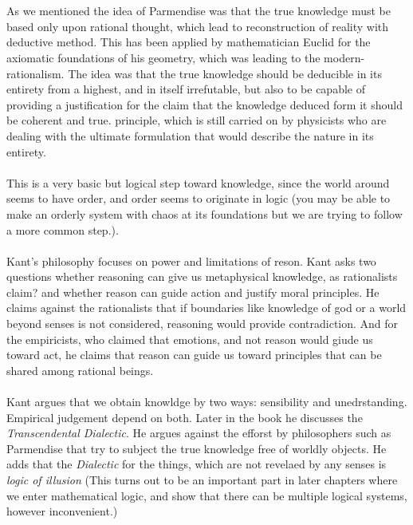 \documentclass[9pt,a4paper,twocolumn]{article}
\begin{document}
                \\
                \\
                As we mentioned the idea of Parmendise was that the true knowledge must be based only upon rational thought, which lead to reconstruction of reality with deductive method. This has been applied by mathematician Euclid for the axiomatic foundations of his geometry, which was leading to the modern-rationalism. The idea was that the true knowledge should be deducible in its entirety from a highest,  and in itself irrefutable, but also to be capable of providing a justification for the claim that the knowledge deduced form it should be coherent and true. principle, which is still carried on by physicists who are dealing with the ultimate formulation that would describe the nature in its entirety. 
                \\
                \\
                This is a very basic but logical step toward knowledge, since the world around seems to have order, and order seems to originate in logic (you may be able to make an orderly system with chaos at its foundations but we are trying to follow a more common step.).\cite{Kuppers2018-vv}
                \\
                \\
                Kant's philosophy focuses on power and limitations of reson. Kant asks two questions whether reasoning can give us metaphysical knowledge, as rationalists claim? and whether reason can guide action and justify moral principles. He claims against the rationalists that if boundaries like knowledge of god or a world beyond senses is not considered, reasoning would provide contradiction. And for the empiricists, who claimed that emotions, and not reason would giude us toward act, he claims that reason can guide us toward principles that can be shared among rational beings.
                \\
                \\
                Kant argues that we obtain knowldge by two ways: sensibility and unedrstanding. Empirical judgement depend on both. Later in the book he discusses the \textit{Transcendental Dialectic}. He argues against the efforst by philosophers such as Parmendise that try to subject the true knowledge free of worldly objects. He adds that the \textit{Dialectic} for the things, which are not revelaed by any senses is \textit{logic of illusion} (This turns out to be an important part in later chapters where we enter mathematical logic, and show that there can be multiple logical systems, however inconvenient.)\cite{sep-kant-reason}
\end{document}
